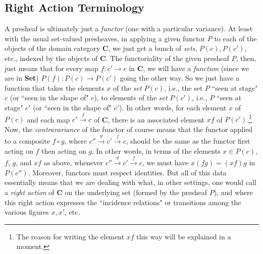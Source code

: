 \documentclass[11pt]{book}
\theoremstyle{definition}
\theoremstyle{definition}
\theoremstyle{definition}
\theoremstyle{theorem}
\theoremstyle{definition}
\begin{document}
\subsection{Right Action Terminology}
A presheaf is ultimately just a \textit{functor} (one with a particular variance). At least with the usual set-valued presheaves, in applying a given functor $P$ to each of the objects of the domain category \textbf{C}, we just get a bunch of \textit{sets}, $P(c), P(c')$, etc., indexed by the objects of \textbf{C}. The functoriality of the given presheaf $P$, then, just means that for every map $f: c' \rightarrow c$ in \textbf{C}, we will have a \textit{function} (since we are in \textbf{Set}) $P(f): P(c) \rightarrow P(c')$ going the other way. So we just have a function that takes the elements $x$ of the \textit{set} $P(c)$, i.e., the set $P$ ``seen at stage" $c$ (or ``seen in the shape of" $c$), to elements of the \textit{set} $P(c')$, i.e., $P$ ``seen at stage" $c'$ (or ``seen in the shape of" $c'$). In other words, for each element $x$ of $P(c)$ and each map $c' \xrightarrow{f} c$ of \textbf{C}, there is an associated element $xf$ of $P(c')$.\footnote{The reason for writing the element $xf$ this way will be explained in a moment.} Now, the \textit{contravariance} of the functor of course means that the functor applied to a composite $f \circ g$, where $c'' \xrightarrow{g} c' \xrightarrow{f} c$, should be the same as the functor first acting on $f$ then acting on $g$. In other words, in terms of the elements $x \in P(c)$, $f$, $g$, and $xf$ as above, whenever $c'' \xrightarrow{g} c' \xrightarrow{f} c$, we must have $x(fg) = (xf)g$ in $P(c'')$. Moreover, functors must respect identities. But all of this data essentially means that we are dealing with what, in other settings, one would call a \textit{right action} of  \textbf{C} on the underlying set (formed by the presheaf $P$), and where this right action expresses the ``incidence relations" or transitions among the various figures $x, x'$, etc.
\par 
\end{document}
